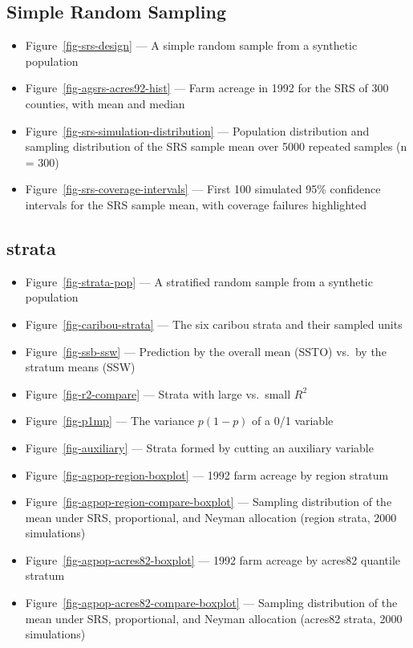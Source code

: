 \documentclass[
  letterpaper,
  DIV=11,
  numbers=noendperiod]{scrreprt}
\providecommand{\tightlist}{%
  \setlength{\itemsep}{0pt}\setlength{\parskip}{0pt}}
\renewcommand{\[}{\begin{equation}}
\renewcommand{\]}{\end{equation}}
\begin{document}
\subsection{Simple Random Sampling}\label{simple-random-sampling-2}

\begin{itemize}
\tightlist
\item
  Figure~\ref{fig-srs-design} --- A simple random sample from a
  synthetic population
\item
  Figure~\ref{fig-agsrs-acres92-hist} --- Farm acreage in 1992 for the
  SRS of 300 counties, with mean and median
\item
  Figure~\ref{fig-srs-simulation-distribution} --- Population
  distribution and sampling distribution of the SRS sample mean over
  5000 repeated samples (n = 300)
\item
  Figure~\ref{fig-srs-coverage-intervals} --- First 100 simulated 95\%
  confidence intervals for the SRS sample mean, with coverage failures
  highlighted
\end{itemize}

\subsection{strata}\label{strata}

\begin{itemize}
\tightlist
\item
  Figure~\ref{fig-strata-pop} --- A stratified random sample from a
  synthetic population
\item
  Figure~\ref{fig-caribou-strata} --- The six caribou strata and their
  sampled units
\item
  Figure~\ref{fig-ssb-ssw} --- Prediction by the overall mean (SSTO)
  vs.~by the stratum means (SSW)
\item
  Figure~\ref{fig-r2-compare} --- Strata with large vs.~small \(R^2\)
\item
  Figure~\ref{fig-p1mp} --- The variance \(p(1-p)\) of a 0/1 variable
\item
  Figure~\ref{fig-auxiliary} --- Strata formed by cutting an auxiliary
  variable
\item
  Figure~\ref{fig-agpop-region-boxplot} --- 1992 farm acreage by region
  stratum
\item
  Figure~\ref{fig-agpop-region-compare-boxplot} --- Sampling
  distribution of the mean under SRS, proportional, and Neyman
  allocation (region strata, 2000 simulations)
\item
  Figure~\ref{fig-agpop-acres82-boxplot} --- 1992 farm acreage by
  acres82 quantile stratum
\item
  Figure~\ref{fig-agpop-acres82-compare-boxplot} --- Sampling
  distribution of the mean under SRS, proportional, and Neyman
  allocation (acres82 strata, 2000 simulations)
\end{itemize}
\end{document}
